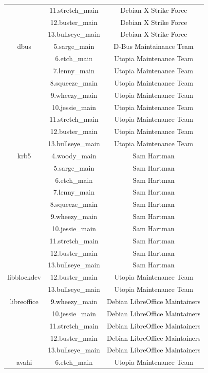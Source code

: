 \documentclass[a4paper, 12pt]{book}
\begin{document}
\begin{longtable}{|c|c|c|}
		& 11.stretch\_main & Debian X Strike Force \\
		& 12.buster\_main & Debian X Strike Force \\
		& 13.bullseye\_main & Debian X Strike Force \\
		\hline
		dbus & 5.sarge\_main & D-Bus Maintainance Team \\
		& 6.etch\_main & Utopia Maintenance Team \\
		& 7.lenny\_main & Utopia Maintenance Team \\
		& 8.squeeze\_main & Utopia Maintenance Team \\
		& 9.wheezy\_main & Utopia Maintenance Team \\
		& 10.jessie\_main & Utopia Maintenance Team \\
		& 11.stretch\_main & Utopia Maintenance Team \\
		& 12.buster\_main & Utopia Maintenance Team \\
		& 13.bullseye\_main & Utopia Maintenance Team \\
		\hline
		krb5 & 4.woody\_main & Sam Hartman \\
		& 5.sarge\_main & Sam Hartman \\
		& 6.etch\_main & Sam Hartman \\
		& 7.lenny\_main & Sam Hartman \\
		& 8.squeeze\_main & Sam Hartman \\
		& 9.wheezy\_main & Sam Hartman \\
		& 10.jessie\_main & Sam Hartman \\
		& 11.stretch\_main & Sam Hartman \\
		& 12.buster\_main & Sam Hartman \\
		& 13.bullseye\_main & Sam Hartman \\
		\hline
		libblockdev & 12.buster\_main & Utopia Maintenance Team \\
		& 13.bullseye\_main & Utopia Maintenance Team \\
		\hline
		libreoffice & 9.wheezy\_main & Debian LibreOffice Maintainers \\
		& 10.jessie\_main & Debian LibreOffice Maintainers \\
		& 11.stretch\_main & Debian LibreOffice Maintainers \\
		& 12.buster\_main & Debian LibreOffice Maintainers \\
		& 13.bullseye\_main & Debian LibreOffice Maintainers \\
		\hline
		avahi & 6.etch\_main & Utopia Maintenance Team \\

\end{longtable}
\end{document}
